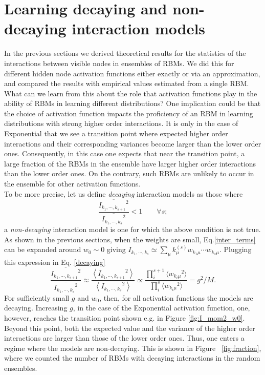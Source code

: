 \documentclass[11pt,letterpaper]{article}
\renewcommand{\red}[1]{#1}
\begin{document}
\section{Learning decaying and non-decaying interaction models}
\label{sec4}
In the previous sections we derived theoretical results for the statistics of the interactions between visible nodes in ensembles of RBMs. We did this for different hidden node activation functions either exactly or via an approximation, and compared the results with empirical values estimated from a single RBM. 
{\red What can we learn from this about the role that activation functions play in the ability of RBMs in learning different distributions? One implication could be that the choice of activation function impacts the proficiency of an RBM in learning distributions with strong higher order interactions. It is only in the case of Exponential that we see a transition point where expected higher order interactions and their corresponding variances become larger than the lower order ones. Consequently, in this case one expects that near the transition point, a large fraction of the RBMs in the ensemble have larger higher order interactions than the lower order ones. On the contrary, such RBMs are unlikely to occur in the ensemble for other activation functions.\\ To be more precise, let us define \textit{decaying} interaction models as those where}
\begin{equation}
\frac{\overline{{I_{k_{1},\cdots,k_{s+1}}}^2}}{\overline{{I_{k_{1},\cdots,k_{s}}}^2}} <1 \qquad \forall s;
\label{decaying}
\end{equation} 
a \textit{non-decaying} interaction model is one for which {\red the above condition} is not true.\\
{\red As shown in the previous sections, when the weights are small, Eq.\eqref{inter_terms} can be expanded around $w_0\sim 0$ giving $I_{k_{1},\cdots,k_{s}} \simeq \sum_{\mu}k_{\mu}^{(s)}w_{k_1\mu}\cdots w_{k_{s}\mu}$. Plugging this expression in Eq. \eqref{decaying}
\begin{equation}
\frac{\overline{{I_{k_{1},\cdots,k_{s+1}}}^2}}{\overline{{I_{k_{1},\cdots,k_{s}}}^2}}\approx \frac{\left\langle {I_{k_{1},\cdots,k_{s+1}}}^2\right\rangle}{\left\langle {I_{k_{1},\cdots,k_{s}}}^2\right\rangle} \propto \frac{\prod_{i}^{s+1}\langle {w_{k_{i}\mu}}^2\rangle}{\prod_{i}^{s}\langle {w_{k_{i}\mu}}^2\rangle}=g^2/M.
\end{equation}
For sufficiently small $g$ and $w_0$, then, for all activation functions the models are decaying. Increasing $g$, in the case of the Exponential activation function, one, however, reaches the transition point shown e.g. in Figure \ref{fig:I_mom2_w0}. Beyond this point, both the expected value and the variance of the higher order interactions are larger than those of the lower order ones. Thus, one enters a regime where the models are non-decaying. This is shown in Figure ~\ref{fig:fraction}, where we counted the number of RBMs with decaying interactions in the random ensembles.}
\end{document}
